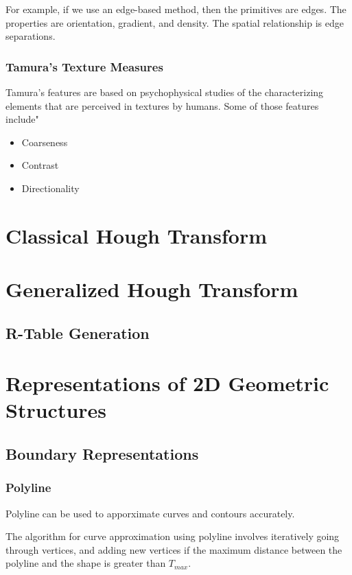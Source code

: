 \documentclass{article}
\begin{document}
\begin{multicols}{2}
For example, if we use an edge-based method, then the primitives are edges. The properties are orientation, gradient, and density. The spatial relationship is edge separations.

\subsubsection{Tamura's Texture Measures}

Tamura's features are based on psychophysical studies of the characterizing elements that are perceived in textures by humans. Some of those features include"

\begin{itemize}
  \item {Coarseness}
  \item {Contrast}
  \item {Directionality}
\end{itemize}

 \section{Classical Hough Transform}

 \section{Generalized Hough Transform}
 \subsection{R-Table Generation}

 \section{Representations of 2D Geometric Structures}
 \subsection{Boundary Representations}
 \subsubsection{Polyline}

  Polyline can be used to apporximate curves and contours accurately.
  
  The algorithm for curve approximation using polyline involves iteratively going through vertices, and adding new vertices if the maximum distance between the polyline and the shape is greater than $T_{max}$.


\end{multicols}
\end{document}
